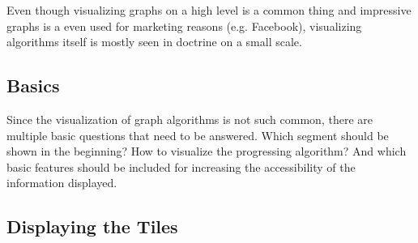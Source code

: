 \documentclass
[
	paper = a4,
    pagesize,
	12 pt,
	oneside,                       %
    open = right,
	DIV = calc,
	BCOR = 0 mm,                   %
	bibtotoc
]
{scrbook}
\begin{document}
Even though visualizing graphs on a high level is a common thing and impressive graphs is a even used for marketing reasons (e.g. Facebook), visualizing algorithms itself is mostly seen in doctrine on a small scale.

\subsection{Basics}


Since the visualization of graph algorithms is not such common, there are multiple basic questions that need to be answered.
Which segment should be shown in the beginning? How to visualize the progressing algorithm?
And which basic features should be included for increasing the accessibility of the information displayed.

\subsection{Displaying the Tiles}

\end{document}
